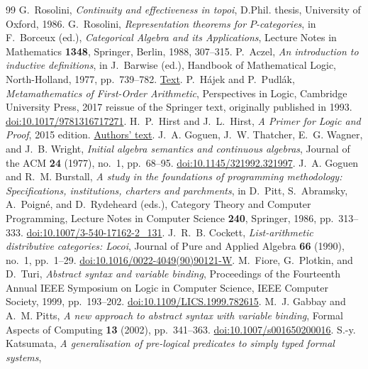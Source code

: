 \begin{thebibliography}{99}
G.~Rosolini, \emph{Continuity and effectiveness in topoi}, D.Phil.
thesis, University of Oxford, 1986.
G.~Rosolini, \emph{Representation theorems for $P$-categories},
in F.~Borceux (ed.), \emph{Categorical Algebra and its Applications},
Lecture Notes in Mathematics \textbf{1348}, Springer, Berlin, 1988,
307--315.
P.~Aczel, \emph{An introduction to inductive definitions},
in J.~Barwise (ed.), Handbook of Mathematical Logic,
North-Holland, 1977, pp.~739--782.
\href{https://lawrencecpaulson.github.io/papers/Aczel-Inductive-Defs.pdf}{Text}.
P.~H\'ajek and P.~Pudl\'ak, \emph{Metamathematics of First-Order
Arithmetic}, Perspectives in Logic, Cambridge University Press,
2017 reissue of the Springer text, originally published in 1993.
\href{https://doi.org/10.1017/9781316717271}{doi:10.1017/9781316717271}.
H.~P.~Hirst and J.~L.~Hirst, \emph{A Primer for Logic and Proof},
2015 edition.
\href{https://www.appstate.edu/~hirstjl/primer/hirst.pdf}{Authors' text}.
J.~A. Goguen, J.~W. Thatcher, E.~G. Wagner, and J.~B. Wright,
\emph{Initial algebra semantics and continuous algebras},
Journal of the ACM \textbf{24} (1977), no.~1, pp.~68--95.
\href{https://doi.org/10.1145/321992.321997}{doi:10.1145/321992.321997}.
J.~A. Goguen and R.~M. Burstall,
\emph{A study in the foundations of programming methodology:
Specifications, institutions, charters and parchments},
in D.~Pitt, S.~Abramsky, A.~Poign\'e, and D.~Rydeheard (eds.),
Category Theory and Computer Programming, Lecture Notes in Computer
Science \textbf{240}, Springer, 1986, pp.~313--333.
\href{https://doi.org/10.1007/3-540-17162-2_131}{doi:10.1007/3-540-17162-2\_131}.
J.~R.~B. Cockett, \emph{List-arithmetic distributive categories: Locoi},
Journal of Pure and Applied Algebra \textbf{66} (1990), no.~1, pp.~1--29.
\href{https://doi.org/10.1016/0022-4049(90)90121-W}{doi:10.1016/0022-4049(90)90121-W}.
M.~Fiore, G.~Plotkin, and D.~Turi,
\emph{Abstract syntax and variable binding},
Proceedings of the Fourteenth Annual IEEE Symposium on Logic in
Computer Science, IEEE Computer Society, 1999, pp.~193--202.
\href{https://doi.org/10.1109/LICS.1999.782615}{doi:10.1109/LICS.1999.782615}.
M.~J. Gabbay and A.~M. Pitts,
\emph{A new approach to abstract syntax with variable binding},
Formal Aspects of Computing \textbf{13} (2002), pp.~341--363.
\href{https://doi.org/10.1007/s001650200016}{doi:10.1007/s001650200016}.
S.-y. Katsumata,
\emph{A generalisation of pre-logical predicates to simply typed formal systems},

\end{thebibliography}
